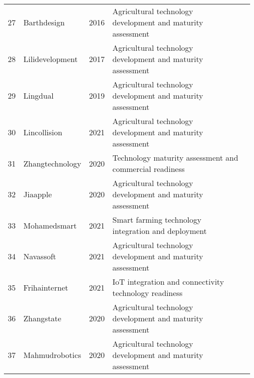\begin{table*}[htbp]
\begin{tabular}{p{}p{}p{}p{}p{}}
27 & Barthdesign & 2016 & Agricultural technology development and maturity assessment & \cite{barth2016design} \\
28 & Lilidevelopment & 2017 & Agricultural technology development and maturity assessment & \cite{lili2017development} \\
29 & Lingdual & 2019 & Agricultural technology development and maturity assessment & \cite{ling2019dual} \\
30 & Lincollision & 2021 & Agricultural technology development and maturity assessment & \cite{lin2021collision} \\
31 & Zhangtechnology & 2020 & Technology maturity assessment and commercial readiness & \cite{zhang2020technology} \\
32 & Jiaapple & 2020 & Agricultural technology development and maturity assessment & \cite{jia2020apple} \\
33 & Mohamedsmart & 2021 & Smart farming technology integration and deployment & \cite{mohamed2021smart} \\
34 & Navassoft & 2021 & Agricultural technology development and maturity assessment & \cite{navas2021soft} \\
35 & Frihainternet & 2021 & IoT integration and connectivity technology readiness & \cite{friha2021internet} \\
36 & Zhangstate & 2020 & Agricultural technology development and maturity assessment & \cite{zhang2020state} \\
37 & Mahmudrobotics & 2020 & Agricultural technology development and maturity assessment & \cite{mahmud2020robotics} \\
\bottomrule
\end{tabular}
\end{table*}

